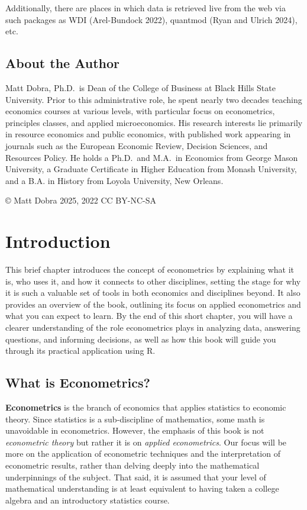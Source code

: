 \documentclass[
  letterpaper,
]{book}
\begin{document}
Additionally, there are places in which data is retrieved live from the
web via such packages as WDI (Arel-Bundock 2022), quantmod (Ryan and
Ulrich 2024), etc.

\section*{About the Author}\label{about-the-author}


Matt Dobra, Ph.D.~is Dean of the College of Business at Black Hills
State University. Prior to this administrative role, he spent nearly two
decades teaching economics courses at various levels, with particular
focus on econometrics, principles classes, and applied microeconomics.
His research interests lie primarily in resource economics and public
economics, with published work appearing in journals such as the
European Economic Review, Decision Sciences, and Resources Policy. He
holds a Ph.D.~and M.A.~in Economics from George Mason University, a
Graduate Certificate in Higher Education from Monash University, and a
B.A. in History from Loyola University, New Orleans.

© Matt Dobra 2025, 2022 CC BY-NC-SA


\chapter{Introduction}\label{sec-intro}

This brief chapter introduces the concept of econometrics by explaining
what it is, who uses it, and how it connects to other disciplines,
setting the stage for why it is such a valuable set of tools in both
economics and disciplines beyond. It also provides an overview of the
book, outlining its focus on applied econometrics and what you can
expect to learn. By the end of this short chapter, you will have a
clearer understanding of the role econometrics plays in analyzing data,
answering questions, and informing decisions, as well as how this book
will guide you through its practical application using R.

\section{What is Econometrics?}\label{what-is-econometrics}

\textbf{Econometrics} is the branch of economics that applies statistics
to economic theory. Since statistics is a sub-discipline of mathematics,
some math is unavoidable in econometrics. However, the emphasis of this
book is not \emph{econometric theory} but rather it is on \emph{applied
econometrics}. Our focus will be more on the application of econometric
techniques and the interpretation of econometric results, rather than
delving deeply into the mathematical underpinnings of the subject. That
said, it is assumed that your level of mathematical understanding is at
least equivalent to having taken a college algebra and an introductory
statistics course.
\end{document}
